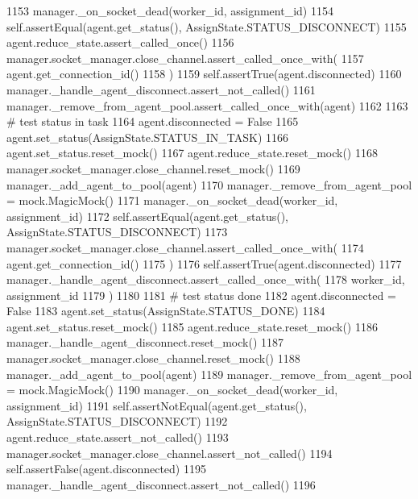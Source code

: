 \begin{DoxyCode}
1153         manager.\_on\_socket\_dead(worker\_id, assignment\_id)
1154         self.assertEqual(agent.get\_status(), AssignState.STATUS\_DISCONNECT)
1155         agent.reduce\_state.assert\_called\_once()
1156         manager.socket\_manager.close\_channel.assert\_called\_once\_with(
1157             agent.get\_connection\_id()
1158         )
1159         self.assertTrue(agent.disconnected)
1160         manager.\_handle\_agent\_disconnect.assert\_not\_called()
1161         manager.\_remove\_from\_agent\_pool.assert\_called\_once\_with(agent)
1162 
1163         \textcolor{comment}{# test status in task}
1164         agent.disconnected = \textcolor{keyword}{False}
1165         agent.set\_status(AssignState.STATUS\_IN\_TASK)
1166         agent.set\_status.reset\_mock()
1167         agent.reduce\_state.reset\_mock()
1168         manager.socket\_manager.close\_channel.reset\_mock()
1169         manager.\_add\_agent\_to\_pool(agent)
1170         manager.\_remove\_from\_agent\_pool = mock.MagicMock()
1171         manager.\_on\_socket\_dead(worker\_id, assignment\_id)
1172         self.assertEqual(agent.get\_status(), AssignState.STATUS\_DISCONNECT)
1173         manager.socket\_manager.close\_channel.assert\_called\_once\_with(
1174             agent.get\_connection\_id()
1175         )
1176         self.assertTrue(agent.disconnected)
1177         manager.\_handle\_agent\_disconnect.assert\_called\_once\_with(
1178             worker\_id, assignment\_id
1179         )
1180 
1181         \textcolor{comment}{# test status done}
1182         agent.disconnected = \textcolor{keyword}{False}
1183         agent.set\_status(AssignState.STATUS\_DONE)
1184         agent.set\_status.reset\_mock()
1185         agent.reduce\_state.reset\_mock()
1186         manager.\_handle\_agent\_disconnect.reset\_mock()
1187         manager.socket\_manager.close\_channel.reset\_mock()
1188         manager.\_add\_agent\_to\_pool(agent)
1189         manager.\_remove\_from\_agent\_pool = mock.MagicMock()
1190         manager.\_on\_socket\_dead(worker\_id, assignment\_id)
1191         self.assertNotEqual(agent.get\_status(), AssignState.STATUS\_DISCONNECT)
1192         agent.reduce\_state.assert\_not\_called()
1193         manager.socket\_manager.close\_channel.assert\_not\_called()
1194         self.assertFalse(agent.disconnected)
1195         manager.\_handle\_agent\_disconnect.assert\_not\_called()
1196 
\end{DoxyCode}


